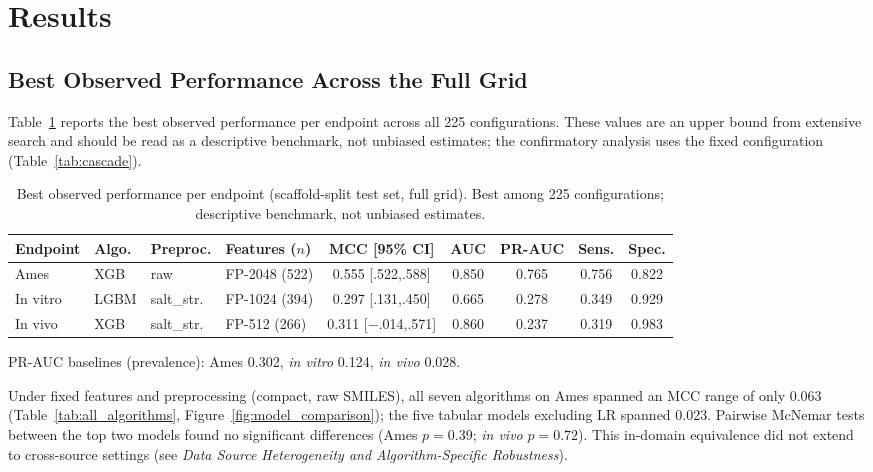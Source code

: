 \section{Results}

\subsection{Best Observed Performance Across the Full Grid}

Table~\ref{tab:best_models} reports the best observed performance per endpoint across all 
225 configurations. These values are an upper bound from extensive search and should be read 
as a descriptive benchmark, not unbiased estimates; the confirmatory analysis uses the fixed 
configuration (Table~\ref{tab:cascade}).

\begin{table}[ht]
\caption{Best observed performance per endpoint (scaffold-split test set, full grid). Best 
among 225 configurations; descriptive benchmark, not unbiased estimates.}
\label{tab:best_models}
\centering
\small
\begin{tabular}{@{}llllccccc@{}}
\toprule
Endpoint & Algo. & Preproc. & Features ($n$) & MCC [95\% CI] & AUC & PR-AUC & Sens. & Spec. \\
\midrule
Ames     & XGB  & raw      & FP-2048 (522) & 0.555 [.522,.588]    & 0.850 & 0.765 & 0.756 & 0.822 \\
In vitro & LGBM & salt\_str. & FP-1024 (394) & 0.297 [.131,.450]  & 0.665 & 0.278 & 0.349 & 0.929 \\
In vivo  & XGB  & salt\_str. & FP-512 (266)  & 0.311 [$-$.014,.571] & 0.860 & 0.237 & 0.319 & 0.983 \\
\bottomrule
\end{tabular}

\medskip
\footnotesize
PR-AUC baselines (prevalence): Ames 0.302, \textit{in vitro} 0.124, \textit{in vivo} 0.028.
\end{table}

Under fixed features and preprocessing (compact, raw SMILES), all seven algorithms on Ames 
spanned an MCC range of only 0.063 (Table~\ref{tab:all_algorithms}, 
Figure~\ref{fig:model_comparison}); the five tabular models excluding LR spanned 0.023. 
Pairwise McNemar tests\cite{McNemar_1947} between the top two models found no significant 
differences (Ames $p = 0.39$; \textit{in vivo} $p = 0.72$). This in-domain equivalence did not 
extend to cross-source settings (see \textit{Data Source Heterogeneity and Algorithm-Specific Robustness}).

